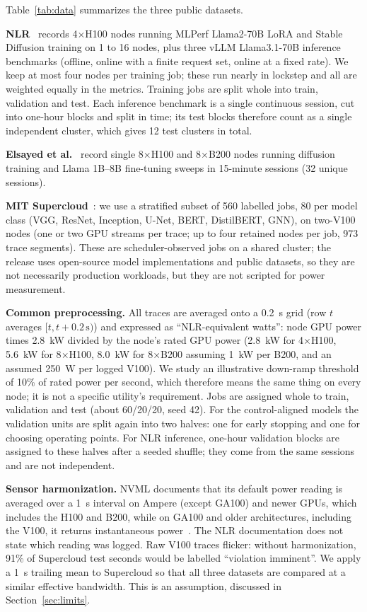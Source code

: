 \documentclass[11pt]{article}
\begin{document}
Table~\ref{tab:data} summarizes the three public datasets.

\textbf{NLR}~\cite{nlr} records 4$\times$H100 nodes running MLPerf Llama2-70B LoRA and Stable Diffusion
training on 1 to 16 nodes, plus three vLLM Llama3.1-70B inference benchmarks (offline, online with a
finite request set, online at a fixed rate). We keep at most four nodes per training job; these run
nearly in lockstep and all are weighted equally in the metrics. Training jobs are split whole into train,
validation and test. Each inference benchmark is a single continuous session, cut into one-hour blocks and
split in time; its test blocks therefore count as a single independent cluster, which gives 12 test
clusters in total.

\textbf{Elsayed et al.}~\cite{elsayed} record single 8$\times$H100 and 8$\times$B200 nodes running diffusion
training and Llama 1B--8B fine-tuning sweeps in 15-minute sessions (32 unique sessions).

\textbf{MIT Supercloud}~\cite{supercloud}: we use a stratified subset of 560 labelled jobs, 80 per model
class (VGG, ResNet, Inception, U-Net, BERT, DistilBERT, GNN), on two-V100 nodes (one or two GPU streams
per trace; up to four retained nodes per job, 973 trace segments). These are scheduler-observed jobs on a shared
cluster; the release uses open-source model implementations and public datasets, so they are not
necessarily production workloads, but they are not scripted for power measurement.

\textbf{Common preprocessing.} All traces are averaged onto a 0.2~s grid (row $t$ averages
$[t, t+0.2\,\mathrm{s})$) and expressed as ``NLR-equivalent watts'': node GPU power times 2.8~kW divided by
the node's rated GPU power (2.8~kW for 4$\times$H100, 5.6~kW for 8$\times$H100, 8.0~kW for 8$\times$B200 assuming 1~kW per
B200, and an assumed 250~W per logged V100). We study an illustrative down-ramp threshold of 10\% of rated power per
second, which therefore means the same thing on every node; it is not a specific utility's requirement. Jobs are assigned whole to train, validation and test (about 60/20/20, seed 42). For the
control-aligned models the validation units are split again into two halves: one for early stopping and
one for choosing operating points. For NLR inference, one-hour validation blocks are assigned to these halves after a seeded shuffle;
they come from the same sessions and are not independent.

\textbf{Sensor harmonization.} NVML documents that its default power reading is averaged over a 1~s
interval on Ampere (except GA100) and newer GPUs, which includes the H100 and B200, while on GA100 and
older architectures, including the V100, it returns instantaneous power~\cite{nvml}. The NLR
documentation does not state which reading was logged. Raw V100 traces flicker: without harmonization,
91\% of Supercloud test seconds would be labelled ``violation imminent''. We apply a 1~s trailing mean to
Supercloud so that all three datasets are compared at a similar effective bandwidth. This is an
assumption, discussed in Section~\ref{sec:limits}.
\end{document}
